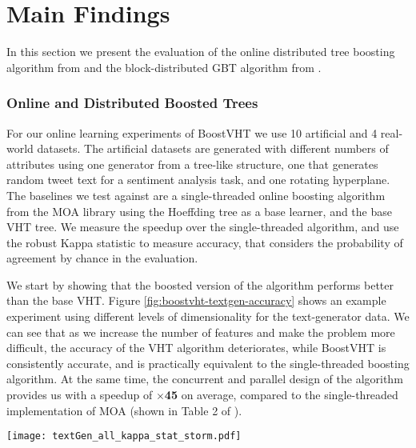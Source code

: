 \section{Main Findings}

In this section we present the evaluation of the online distributed tree boosting
algorithm from \boostvht and the block-distributed GBT algorithm from \blockgbt.

\subsubsection*{Online and Distributed Boosted Trees}
\label{sec:boostvht-results}

For our online learning experiments of BoostVHT we use 10 artificial and 4 real-world datasets. The artificial
datasets are generated with different numbers of attributes using one generator
from a tree-like structure, one that generates random tweet text for a sentiment
analysis task, and one rotating hyperplane. The baselines we test against are
a single-threaded online boosting algorithm from the MOA \cite{bifet2010moa}
library using the Hoeffding tree as a base learner, and the base VHT tree.
We measure the speedup over the single-threaded algorithm, and use the
robust Kappa\cite{bifet2015efficient} statistic to measure accuracy,
that considers the probability of agreement by chance in the evaluation.

We start by showing that the boosted version of the algorithm performs
better than the base VHT. Figure \ref{fig:boostvht-textgen-accuracy} shows an example experiment using different
levels of dimensionality for the text-generator data. We can see
that as we increase the number of features and make the problem more
difficult, the accuracy of the VHT algorithm deteriorates, while
BoostVHT is consistently accurate, and is practically equivalent to the single-threaded
boosting algorithm. At the same time, the concurrent and parallel design of the algorithm
provides us with a speedup of \textbf{$\times$45} on average, compared to the single-threaded
implementation of MOA (shown in Table 2 of \boostvht).

\begin{figure*}
	\centering
	\texttt{[image: textGen\_all\_kappa\_stat\_storm.pdf]}
	\caption{Kappa statistic (accuracy) as a function of arriving instances over time for text generator datasets with
		an increasing number of attributes.}
	\label{fig:boostvht-textgen-accuracy}
\end{figure*}

